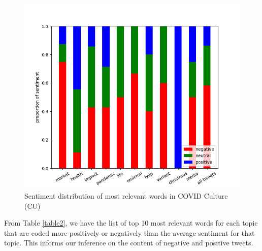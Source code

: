 \documentclass[letterpaper]{article} %
\begin{document}
\begin{figure}[H]
    \centering
    \includegraphics[scale=0.45]{CU_word_sentiment.png}
    \caption{Sentiment distribution of most relevant words in COVID Culture (CU)}
    \label{fig:cu-dist}
\end{figure}
From Table \ref{table2}, we have the list of top 10 most relevant words for each topic that are coded more positively or negatively than the average sentiment for that topic. This informs our inference on the content of negative and positive tweets.
\end{document}
